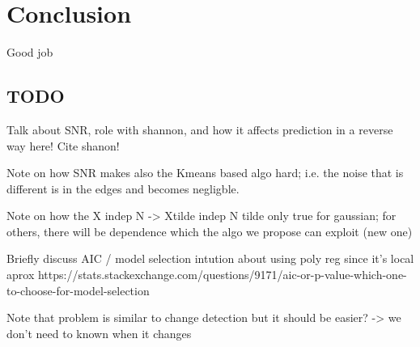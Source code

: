 \chapter{Conclusion}

Good job

\section{TODO}

Talk about SNR, role with shannon, and how it affects prediction in a reverse way here! Cite shanon!

Note on how SNR makes also the Kmeans based algo hard; i.e. the noise that is different is 
in the edges and becomes negligble.

Note on how the X indep N -> Xtilde indep N tilde only true for gaussian; for others, there 
will be dependence which the algo we propose can exploit (new one)


Briefly discuss AIC / model selection
intution about using poly reg since it's local
aprox
https://stats.stackexchange.com/questions/9171/aic-or-p-value-which-one-to-choose-for-model-selection

Note that problem is similar to change detection
but it should be easier? -> we don't need to known
when it changes